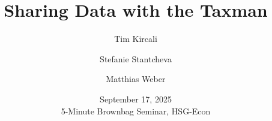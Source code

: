 \documentclass{beamer}
\title[Sharing Data with the Taxman]{Sharing Data with the Taxman}%
\author[Kircali, Stantcheva and Weber] %
{Tim Kircali\inst{1} \and Stefanie Stantcheva\inst{2} \and Matthias Weber\inst{1}}
\institute[] %
{
\inst{1} University of St.Gallen \\
\inst{2} Harvard University
}
{
\medskip

}
\date[September 17, 2025]{September 17, 2025\\ 5-Minute Brownbag Seminar, HSG-Econ}
\begin{document}
\begin{frame}
\titlepage %
\end{frame}










\end{document}
